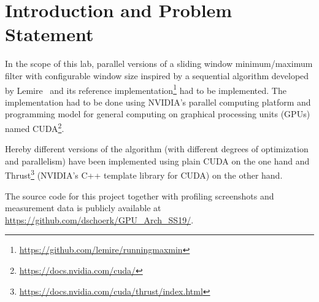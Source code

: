 
\section{Introduction and Problem Statement}

In the scope of this lab, parallel versions of a sliding window minimum/maximum filter with configurable window size inspired by a sequential algorithm developed by Lemire~\cite{lemire2006streaming} and its reference implementation\footnote{\url{https://github.com/lemire/runningmaxmin}} had to be implemented. The implementation had to be done using NVIDIA's parallel computing platform and programming model for general computing on graphical processing units (GPUs) named CUDA\footnote{\url{https://docs.nvidia.com/cuda/}}.

Hereby different versions of the algorithm (with different degrees of optimization and parallelism) have been implemented using plain CUDA on the one hand and Thrust\footnote{\url{https://docs.nvidia.com/cuda/thrust/index.html}} (NVIDIA's C++ template library for CUDA) on the other hand.
 
The source code for this project together with profiling screenshots and measurement data is publicly available at \url{https://github.com/dschoerk/GPU_Arch_SS19/}.
